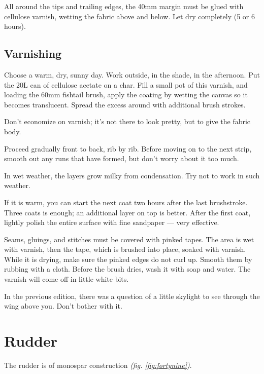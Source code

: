 \documentclass{book}
\begin{document}
All around the tips and trailing edges, the 40mm margin must be glued
with cellulose varnish, wetting the fabric above and below.  Let dry
completely (5 or 6 hours).

\subsection{Varnishing}

Choose a warm, dry, sunny day.  Work outside, in the shade, in the
afternoon.  Put the 20L can of cellulose acetate on a char.  Fill a
small pot of this varnish, and loading the 60mm fishtail brush, apply
the coating by wetting the canvas so it becomes translucent.  Spread
the excess around with additional brush strokes.

Don't economize on varnish; it's not there to look pretty, but to give
the fabric body.

Proceed gradually front to back, rib by rib.  Before moving on to the
next strip, smooth out any runs that have formed, but don't worry
about it too much.

In wet weather, the layers grow milky from condensation.  Try not to
work in such weather.

If it is warm, you can start the next coat two hours after the last
brushstroke.  Three coats is enough; an additional layer on top is
better.  After the first coat, lightly polish the entire surface with
fine sandpaper --- very effective.

Seams, gluings, and stitches must be covered with pinked tapes.  The
area is wet with varnish, then the tape, which is brushed into place,
soaked with varnish.  While it is drying, make sure the pinked edges
do not curl up.  Smooth them by rubbing with a cloth.  Before the
brush dries, wash it with soap and water.  The varnish will come off
in little white bits.

In the previous edition, there was a question of a little skylight to
see through the wing above you.  Don't bother with it.

\section{Rudder}

The rudder is of monospar construction
\textit{(fig. \ref{fig:fortynine})}.
\end{document}
